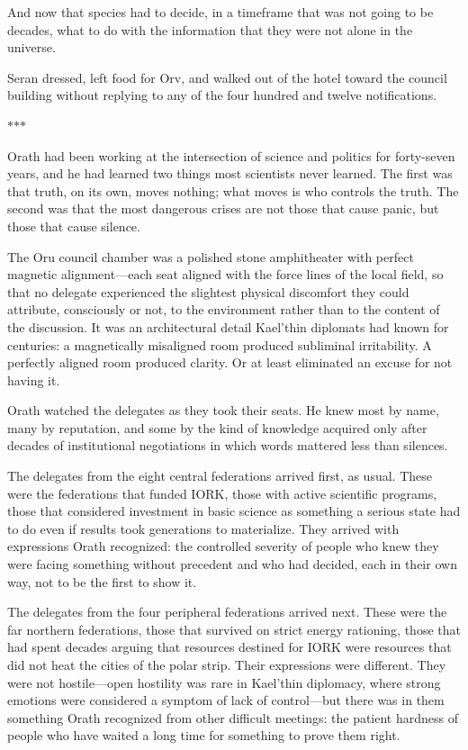 \documentclass[11pt,a5paper,twoside]{book}
\begin{document}
And now that species had to decide, in a timeframe that was not going to be decades, what to do with the information that they were not alone in the universe.

Seran dressed, left food for Orv, and walked out of the hotel toward the council building without replying to any of the four hundred and twelve notifications.

\vspace{1.5em}
\begin{center}$\ast$\quad$\ast$\quad$\ast$\end{center}
\vspace{1.5em}

Orath had been working at the intersection of science and politics for forty-seven years, and he had learned two things most scientists never learned. The first was that truth, on its own, moves nothing; what moves is who controls the truth. The second was that the most dangerous crises are not those that cause panic, but those that cause silence.

The Oru council chamber was a polished stone amphitheater with perfect magnetic alignment—each seat aligned with the force lines of the local field, so that no delegate experienced the slightest physical discomfort they could attribute, consciously or not, to the environment rather than to the content of the discussion. It was an architectural detail Kael'thin diplomats had known for centuries: a magnetically misaligned room produced subliminal irritability. A perfectly aligned room produced clarity. Or at least eliminated an excuse for not having it.

Orath watched the delegates as they took their seats. He knew most by name, many by reputation, and some by the kind of knowledge acquired only after decades of institutional negotiations in which words mattered less than silences.

The delegates from the eight central federations arrived first, as usual. These were the federations that funded IORK, those with active scientific programs, those that considered investment in basic science as something a serious state had to do even if results took generations to materialize. They arrived with expressions Orath recognized: the controlled severity of people who knew they were facing something without precedent and who had decided, each in their own way, not to be the first to show it.

The delegates from the four peripheral federations arrived next. These were the far northern federations, those that survived on strict energy rationing, those that had spent decades arguing that resources destined for IORK were resources that did not heat the cities of the polar strip. Their expressions were different. They were not hostile—open hostility was rare in Kael'thin diplomacy, where strong emotions were considered a symptom of lack of control—but there was in them something Orath recognized from other difficult meetings: the patient hardness of people who have waited a long time for something to prove them right.
\end{document}
